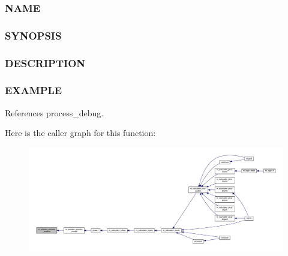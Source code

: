 \subsubsection*{N\+A\+ME}

\subsubsection*{S\+Y\+N\+O\+P\+S\+IS}

\subsubsection*{D\+E\+S\+C\+R\+I\+P\+T\+I\+ON}

\subsubsection*{E\+X\+A\+M\+P\+LE}

References process\+\_\+debug.

Here is the caller graph for this function\+:
\nopagebreak
\begin{figure}[H]
\begin{center}
\leavevmode
\includegraphics[width=350pt]{namespacem__process_acbc72c5ed371430a471aa1f3010fbbda_icgraph}
\end{center}
\end{figure}
\mbox{\label{namespacem__process_a08887a918eba167ceacddf58ca084270}} 
